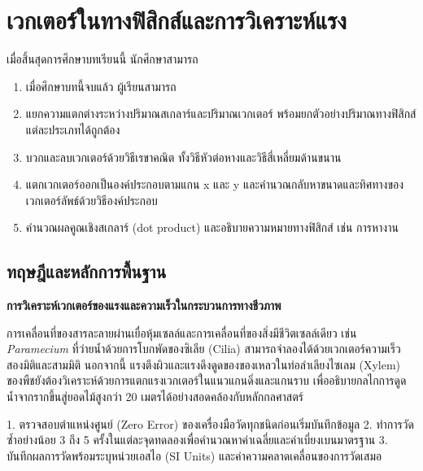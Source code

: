 \chapter{เวกเตอร์ในทางฟิสิกส์และการวิเคราะห์แรง}
\label{ch:ch02_vectors}

\begin{conceptbox}[title=วัตถุประสงค์การเรียนรู้ประจำบท]
เมื่อสิ้นสุดการศึกษาบทเรียนนี้ นักศึกษาสามารถ
\begin{enumerate}
    \item เมื่อศึกษาบทนี้จบแล้ว ผู้เรียนสามารถ
    \item แยกความแตกต่างระหว่างปริมาณสเกลาร์และปริมาณเวกเตอร์ พร้อมยกตัวอย่างปริมาณทางฟิสิกส์แต่ละประเภทได้ถูกต้อง
    \item บวกและลบเวกเตอร์ด้วยวิธีเรขาคณิต ทั้งวิธีหัวต่อหางและวิธีสี่เหลี่ยมด้านขนาน
    \item แตกเวกเตอร์ออกเป็นองค์ประกอบตามแกน x และ y และคำนวณกลับหาขนาดและทิศทางของเวกเตอร์ลัพธ์ด้วยวิธีองค์ประกอบ
    \item คำนวณผลคูณเชิงสเกลาร์ (dot product) และอธิบายความหมายทางฟิสิกส์ เช่น การหางาน
\end{enumerate}
\end{conceptbox}

\section{ทฤษฎีและหลักการพื้นฐาน}

\begin{bioappbox}
\textbf{การวิเคราะห์เวกเตอร์ของแรงและความเร็วในกระบวนการทางชีวภาพ}

การเคลื่อนที่ของสารละลายผ่านเยื่อหุ้มเซลล์และการเคลื่อนที่ของสิ่งมีชีวิตเซลล์เดียว เช่น \textit{Paramecium} ที่ว่ายน้ำด้วยการโบกพัดของซิเลีย (Cilia) สามารถจำลองได้ด้วยเวกเตอร์ความเร็วสองมิติและสามมิติ นอกจากนี้ แรงตึงผิวและแรงดึงดูดของของเหลวในท่อลำเลียงไซเลม (Xylem) ของพืชยังต้องวิเคราะห์ด้วยการแตกแรงเวกเตอร์ในแนวแกนดิ่งและแกนราบ เพื่ออธิบายกลไกการดูดน้ำจากรากขึ้นสู่ยอดไม้สูงกว่า 20 เมตรได้อย่างสอดคล้องกับหลักกลศาสตร์
\end{bioappbox}

\begin{labbox}
1. ตรวจสอบตำแหน่งศูนย์ (Zero Error) ของเครื่องมือวัดทุกชนิดก่อนเริ่มบันทึกข้อมูล
2. ทำการวัดซ้ำอย่างน้อย 3 ถึง 5 ครั้งในแต่ละจุดทดลองเพื่อคำนวณหาค่าเฉลี่ยและค่าเบี่ยงเบนมาตรฐาน
3. บันทึกผลการวัดพร้อมระบุหน่วยเอสไอ (SI Units) และค่าความคลาดเคลื่อนของการวัดเสมอ
\end{labbox}


